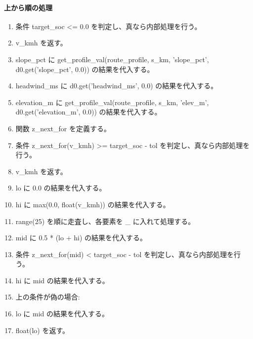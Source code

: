 \documentclass[a4paper,11pt]{article}
\begin{document}
            \paragraph{上から順の処理}
            \begin{enumerate}[leftmargin=1.8em]
            \item 条件 target\_soc <= 0.0 を判定し、真なら内部処理を行う。
\item   v\_kmh を返す。
\item slope\_pct に get\_profile\_val(route\_profile, s\_km, 'slope\_pct', d0.get('slope\_pct', 0.0)) の結果を代入する。
\item headwind\_ms に d0.get('headwind\_ms', 0.0) の結果を代入する。
\item elevation\_m に get\_profile\_val(route\_profile, s\_km, 'elev\_m', d0.get('elevation\_m', 0.0)) の結果を代入する。
\item 関数 z\_next\_for を定義する。
\item 条件 z\_next\_for(v\_kmh) >= target\_soc - tol を判定し、真なら内部処理を行う。
\item   v\_kmh を返す。
\item lo に 0.0 の結果を代入する。
\item hi に max(0.0, float(v\_kmh)) の結果を代入する。
\item range(25) を順に走査し、各要素を \_ に入れて処理する。
\item   mid に 0.5 * (lo + hi) の結果を代入する。
\item   条件 z\_next\_for(mid) < target\_soc - tol を判定し、真なら内部処理を行う。
\item     hi に mid の結果を代入する。
\item     上の条件が偽の場合:
\item     lo に mid の結果を代入する。
\item float(lo) を返す。
            \end{enumerate}
\end{document}
